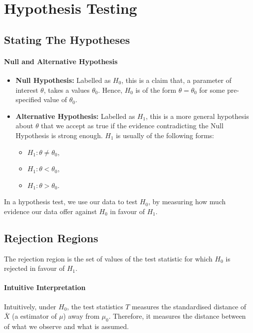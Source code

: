 \section{Hypothesis Testing}

\subsection{Stating The Hypotheses}
\paragraph{Null and Alternative Hypothesis}
\begin{itemize}
  \item \textbf{Null Hypothesis:} Labelled as \(H_0\), this is a claim that, a parameter
    of interest  \(\theta\), takes a values \(\theta_0\). Hence,
      \(H_0\) is of the form  \(\theta = \theta_0\) for some pre-specified
      value of \(\theta_0\).
  \item \textbf{Alternative Hypothesis:} Labelled as \(H_1\),
    this is a more general hypothesis about  \(\theta\) that we accept as true if the
    evidence contradicting the Null Hypothesis is strong enough. \(H_1\) is usually
    of the following forms:
     \begin{itemize}
      \item \(H_1: \theta \neq  \theta_0\),
      \item \(H_1: \theta <  \theta_0\),
      \item \(H_1: \theta >  \theta_0\).
    \end{itemize}
\end{itemize}
In a hypothesis test, we use our data to test \(H_0\), by measuring how much evidence our data offer against \(H_0\) in favour of \(H_1\).

\subsection{Rejection Regions}
The rejection region is the set of values of the test statistic for which \(H_0\) is rejected in favour of \(H_1\).

\paragraph{Intuitive Interpretation}
Intuitively, under \(H_0\), the test statistics \(T\) measures the standardised distance of \(\bar{X}\) (a estimator of \(\mu\)) away from \(\mu_0\). Therefore, it measures the distance between of what we observe and what is assumed.

